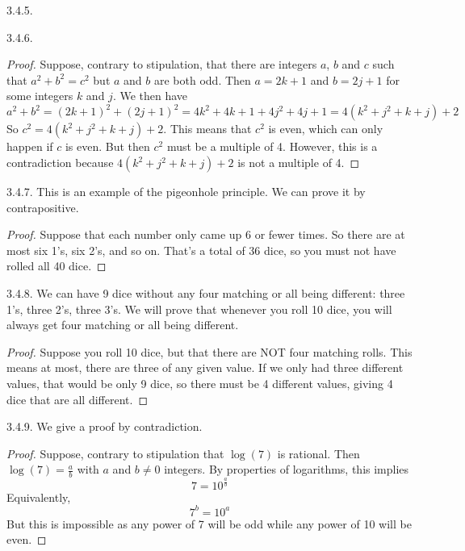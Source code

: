 \begin {itemize}
\begin{ans}{3.4.5.}
	
\end{ans}
\begin{ans}{3.4.6.}
	  \begin{proof}
	    Suppose, contrary to stipulation, that there are integers $a$, $b$ and $c$ such that $a^2 + b^2 = c^2$ but $a$ and $b$ are both odd.  Then $a = 2k+1$ and $b = 2j + 1$ for some integers $k$ and $j$.  We then have
	    \[a^2 + b^2 = (2k+1)^2 + (2j+1)^2 = 4k^2 + 4k + 1 + 4j^2 + 4j + 1 = 4(k^2 + j^2 + k + j) + 2\]
	    So $c^2 = 4(k^2 + j^2 + k + j) + 2$.  This means that $c^2$ is even, which can only happen if $c$ is even.  But then $c^2$ must be a multiple of 4.  However, this is a contradiction because $4(k^2 + j^2 + k + j) + 2$ is not a multiple of 4.
	  \end{proof}

	
\end{ans}
\begin{ans}{3.4.7.}
	This is an example of the pigeonhole principle.  We can prove it by contrapositive.

	\begin{proof}
	Suppose that each number only came up 6 or fewer times.  So there are at most six 1's, six 2's, and so on.  That's a total of 36 dice, so you must not have rolled all 40 dice.
	\end{proof}
	
\end{ans}
\begin{ans}{3.4.8.}
		We can have 9 dice without any four matching or all being different: three 1's, three 2's, three 3's.  We will prove that whenever you roll 10 dice, you will always get four matching or all being different.
		\begin{proof}
			Suppose you roll 10 dice, but that there are NOT four matching rolls.  This means at most, there are three of any given value.  If we only had three different values, that would be only 9 dice, so there must be 4 different values, giving 4 dice that are all different.
		\end{proof}
	
\end{ans}
\begin{ans}{3.4.9.}
	 We give a proof by contradiction.
	\begin{proof}
	  Suppose, contrary to stipulation that $\log(7)$ is rational.  Then $\log(7) = \frac{a}{b}$ with $a$ and $b \ne 0$ integers.  By properties of logarithms, this implies
	  \[7 = 10^{\frac{a}{b}}\]
	  Equivalently,
	  \[7^b = 10^a\]
	  But this is impossible as any power of 7 will be odd while any power of 10 will be even.
	\end{proof}
	

\end{ans}
\end{itemize}
